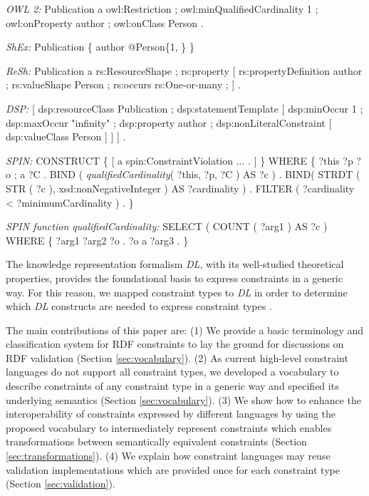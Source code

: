 \documentclass[a4paper,fontsize=11pt]{scrartcl}
\begin{document}
\begin{ex}[commandchars=\\\{\}]
\textit{OWL 2:} Publication a owl:Restriction ;
          owl:minQualifiedCardinality 1 ;
          owl:onProperty author ;
          owl:onClass Person .
		
\textit{ShEx:} Publication \{ author @Person\{1, \} \}

\textit{ReSh:} Publication a rs:ResourceShape ; rs:property [
          rs:propertyDefinition author ;
          rs:valueShape Person ;
          rs:occurs rs:One-or-many ; ] .
		
\textit{DSP:} [ dsp:resourceClass Publication ; dsp:statementTemplate [ 
          dsp:minOccur 1 ; dsp:maxOccur "infinity" ; 
          dsp:property author ; 
          dsp:nonLiteralConstraint [ dsp:valueClass Person ] ] ] .
					
\textit{SPIN:} CONSTRUCT \{ [ a spin:ConstraintViolation ... . ] \} WHERE \{ 
          ?this ?p ?o ; a ?C .
          BIND ( \textit{qualifiedCardinality}( ?this, ?p, ?C ) AS ?c ) .
          BIND( STRDT ( STR ( ?c ), xsd:nonNegativeInteger ) AS ?cardinality ) .
          FILTER ( ?cardinality < ?minimumCardinality ) . \}
						
\textit{SPIN function qualifiedCardinality:}										
SELECT ( COUNT ( ?arg1 ) AS ?c ) WHERE \{ ?arg1 ?arg2 ?o . ?o a ?arg3 . \}
\end{ex}

The knowledge representation formalism {\em DL}, with its  well-studied theoretical properties, provides the foundational basis to express constraints in a generic way. 
For this reason, we mapped constraint types to \emph{DL} 
in order to determine which \emph{DL} constructs are needed to express constraint types \cite{BoschNolleAcarEckert2015}.

The main contributions of this paper are:
(1) We provide a basic terminology and classification system for RDF constraints to lay the ground for discussions on RDF validation (Section \ref{sec:vocabulary}).
(2) As current high-level constraint languages do not support all constraint types, 
we developed a vocabulary to describe constraints of any constraint type in a generic way and specified its underlying semantics (Section \ref{sec:vocabulary}).
(3) We show how to enhance the interoperability of constraints expressed by different languages by using the proposed vocabulary 
to intermediately represent constraints 
which enables transformations between semantically equivalent constraints (Section \ref{sec:transformations}).
(4) We explain how constraint languages may reuse validation implementations which are provided once for each constraint type (Section \ref{sec:validation}).
\end{document}

